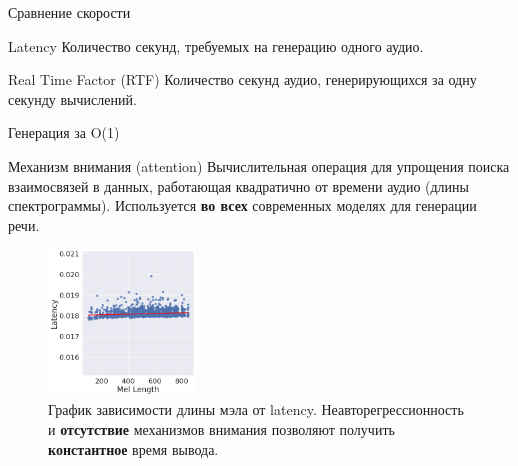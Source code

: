 \begin{frame}{Сравнение скорости}
\begin{block}{Latency}
    Количество секунд, требуемых на генерацию одного аудио.
\end{block}
\begin{block}{Real Time Factor (RTF)}
    Количество секунд аудио, генерирующихся за одну секунду вычислений.
\end{block}
\begin{table}[!ht]
\centering
{}
\caption{Сравнение скорости генерации с $95\%$ доверительным интервалом. Количество примеров для усреднения -- 2048, а средняя длина мэл-спектрограммы -- 540. Как видно, \textbf{TalkNet значительно быстрее} современных методов.}
\end{table}
\end{frame}

\begin{frame}{Генерация за O(1)}
\begin{block}{Механизм внимания (attention)}
    Вычислительная операция для упрощения поиска взаимосвязей в данных, работающая квадратично от времени аудио (длины спектрограммы). Используется \textbf{во всех} современных моделях для генерации речи.
\end{block}
\begin{figure}[H]
\centering
\includegraphics[width=0.35\textwidth]{images/len-lat.png}
\caption{График зависимости длины мэла от latency. Неавторегрессионность и \textbf{отсутствие} механизмов внимания позволяют получить \textbf{константное} время вывода.}
\end{figure}
\end{frame}

